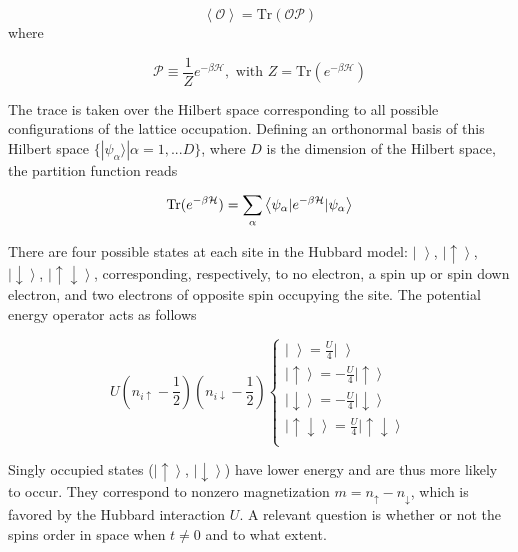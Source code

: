 \begin{equation}
\left\langle \mathcal{O} \right\rangle = \text{Tr} ( \mathcal{O} \mathcal{P} )
\end{equation}
where

\begin{equation}\label{eq:projection}
\mathcal{P} \equiv \frac{1}{Z} e^{-\beta \mathcal{H} } , \text{ with } Z = \text{Tr} ( e^{-\beta \mathcal{H} } )
\end{equation}

The trace is taken over the Hilbert space corresponding to all possible configurations of the lattice occupation.
Defining an orthonormal basis of this Hilbert space $\{ | \psi_\alpha \rangle | \alpha = 1, ... D \} $, where $D$ is the dimension of the Hilbert space, the partition function reads

\begin{equation}\label{eq:z_asEigen}
\operatorname{Tr} ( e^{-\beta \mathcal{H} } )= \sum_\alpha \left\langle \psi_\alpha | e^{-\beta \mathcal{H} } | \psi_\alpha \right\rangle
\end{equation}

There are four possible states at each site in the Hubbard model: $\left| \,\, \right\rangle$, $\left|\uparrow \right\rangle$, $\left|\downarrow\right \rangle$, $\left|\uparrow \downarrow \right\rangle $, corresponding, respectively, to no electron, a spin up or spin down electron, and two electrons of opposite spin occupying the site.
The potential energy operator acts as follows

\begin{equation}
U (n_{i\uparrow} - \frac{1}{2} ) ( n_{i\downarrow} - \frac{1}{2} ) 
\begin{cases}
\left| \,\, \right\rangle = \frac{U}{4} \left| \,\, \right\rangle \\
\left|\uparrow \right\rangle = -\frac{U}{4} \left|\uparrow \right\rangle \\
\left|\downarrow\right \rangle = -\frac{U}{4} \left|\downarrow\right \rangle \\
\left|\uparrow \downarrow \right\rangle = \frac{U}{4} \left|\uparrow \downarrow \right\rangle \\
\end{cases}
\end{equation}

Singly occupied states ($\left|\uparrow \right\rangle$, $\left|\downarrow\right \rangle$) have lower energy and are thus more likely to occur.
They correspond to nonzero magnetization $m = n_{\uparrow} - n_{\downarrow}$, which is favored by the Hubbard interaction $U$.
A relevant question is whether or not the spins order in space when $t \neq 0$ and to what extent.

